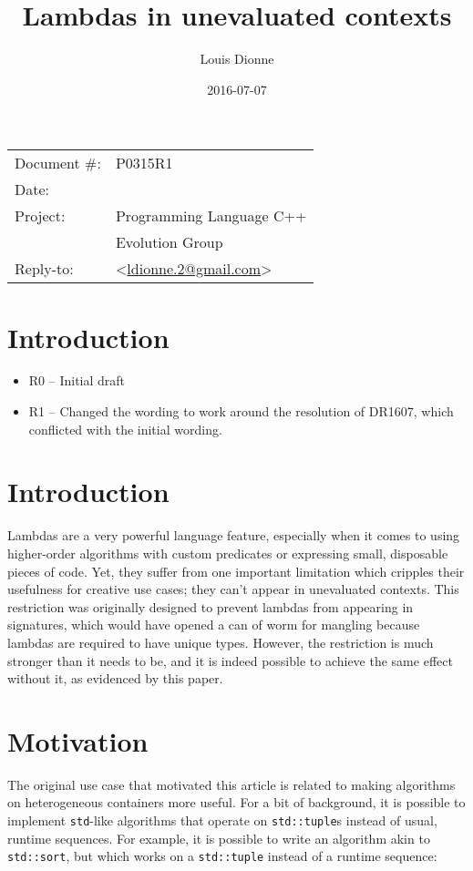 \documentclass[11pt]{article}
\date{}
\title{Lambdas in unevaluated contexts}
\author{}
\newcommand{\cc}[1]{\texttt{#1}}
\begin{document}
\maketitle\vspace{-2cm}

\begin{flushright}
  \begin{tabular}{ll}
  Document \#:&P0315R1\\
  Date:       &\date{2016-07-07}\\
  Project:    &Programming Language C++\\
              &Evolution Group\\
  Reply-to:   &\author{Louis Dionne} \textless\href{mailto:ldionne.2@gmail.com}{ldionne.2@gmail.com}\textgreater
  \end{tabular}
\end{flushright}

\section{Introduction}
\begin{itemize}
  \item R0 -- Initial draft
  \item R1 -- Changed the wording to work around the resolution of DR1607,
              which conflicted with the initial wording.
\end{itemize}


\section{Introduction}
Lambdas are a very powerful language feature, especially when it comes to using
higher-order algorithms with custom predicates or expressing small, disposable
pieces of code. Yet, they suffer from one important limitation which cripples
their usefulness for creative use cases; they can't appear in unevaluated
contexts. This restriction was originally designed to prevent lambdas from
appearing in signatures, which would have opened a can of worm for mangling
because lambdas are required to have unique types. However, the restriction is
much stronger than it needs to be, and it is indeed possible to achieve the
same effect without it, as evidenced by this paper.


\section{Motivation}
The original use case that motivated this article is related to making algorithms
on heterogeneous containers more useful. For a bit of background, it is possible
to implement \cc{std}-like algorithms that operate on \cc{std::tuple}s instead of
usual, runtime sequences. For example, it is possible to write an algorithm akin
to \cc{std::sort}, but which works on a \cc{std::tuple} instead of a runtime
sequence:
\end{document}
